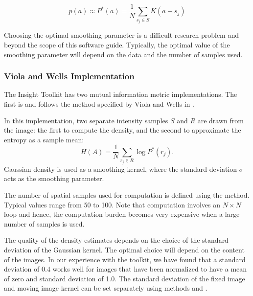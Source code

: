 \begin{equation}
p(a) \approx P^{*}(a) = \frac{1}{N} \sum_{s_j \in S} K\left(a - s_j\right)
\end{equation}

Choosing the optimal smoothing parameter is a difficult research problem and
beyond the scope of this software guide.  Typically, the optimal value of the
smoothing parameter will depend on the data and the number of samples used.

\subsubsection{Viola and Wells Implementation}

The Insight Toolkit has two mutual information metric implementations. The
first is  and follows the method
specified by Viola and Wells in \cite{Viola1997}.


In this implementation, two separate intensity samples $S$ and $R$ are drawn
from the image: the first to compute the density, and the second to approximate
the entropy as a sample mean:
\begin{equation}
H(A) = \frac{1}{N} \sum_{r_j \in R} \log P^{*}(r_j).
\end{equation}
Gaussian density is used as a smoothing kernel, where the standard deviation
$\sigma$ acts as the smoothing parameter.


The number of spatial samples used for computation is defined using
the  method. Typical values range from 50 to 100.
Note that computation involves an $N \times N$ loop and hence, the computation
burden becomes very expensive when a large number of samples is used.

The quality of the density estimates depends on the choice of the standard
deviation of the Gaussian kernel. The optimal choice will depend on the
content of the images.  In our experience with the toolkit, we have found
that a standard deviation of 0.4 works well for images that have been
normalized to have a mean of zero and standard deviation of 1.0. The standard
deviation of the fixed image and moving image kernel can be set separately
using methods
 and .

